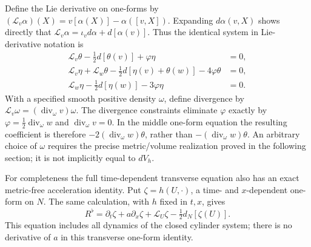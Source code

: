 Define the Lie derivative on one-forms by
$(\mathcal L_v\alpha)(X)=v[\alpha(X)]-\alpha([v,X])$.
Expanding $d\alpha(v,X)$ shows directly that
$\mathcal L_v\alpha=\iota_vd\alpha+d[\alpha(v)]$.
Thus the identical system in Lie-derivative notation is
\begin{align}
 \mathcal L_v\theta-\tfrac12d[\theta(v)]+\varphi\eta&=0,\\
 \mathcal L_v\eta+\mathcal L_w\theta
 -\tfrac12d[\eta(v)+\theta(w)]-4\varphi\theta&=0,\\
 \mathcal L_w\eta-\tfrac12d[\eta(w)]-3\varphi\eta&=0.
 \label{eq:wb-lie-system}
\end{align}
With a specified smooth positive density $\omega$, define divergence
by $\mathcal L_v\omega=(\operatorname{div}_\omega v)\omega$.
The divergence constraints eliminate $\varphi$ exactly by
$\varphi=\frac12\operatorname{div}_\omega w$ and
$\operatorname{div}_\omega v=0$. In the middle one-form equation
the resulting coefficient is therefore
$-2(\operatorname{div}_\omega w)\theta$, rather than
$-(\operatorname{div}_\omega w)\theta$. An arbitrary choice of
$\omega$ requires the precise metric/volume realization proved in
the following section; it is not implicitly equal to $dV_h$.

For completeness the full time-dependent transverse equation also
has an exact metric-free acceleration identity. Put
$\zeta=h(U,\cdot)$, a time- and $x$-dependent one-form on $N$.
The same calculation, with $h$ fixed in $t,x$, gives
\[
 R^\flat=\partial_t\zeta+a\partial_x\zeta
 +\mathcal L_U\zeta-\tfrac12d_N[\zeta(U)].
\]
This equation includes all dynamics of the closed cylinder system;
there is no derivative of $a$ in this transverse one-form identity.

